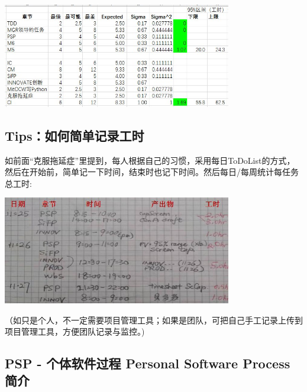 
\includegraphics[width=10cm]{PSPcalculate3wks95rangeScreenshot20221126105325.jpg}

\hypertarget{tipsux5982ux4f55ux7b80ux5355ux8bb0ux5f55ux5de5ux65f6}{%
\subsection{Tips：如何简单记录工时}\label{tipsux5982ux4f55ux7b80ux5355ux8bb0ux5f55ux5de5ux65f6}}

如前面``克服拖延症''里提到，每人根据自己的习惯，采用每日ToDoList的方式，然后在开始前，简单记一下时间，结束时也记下时间。然后每日/每周统计每任务总工时:


\includegraphics[width=10cm]{Psp手工时间表12.jpg}

（如只是个人，不一定需要项目管理工具；如果是团队，可把自己手工记录上传到项目管理工具，方便团队记录与监控。)

\hypertarget{psp---ux4e2aux4f53ux8f6fux4ef6ux8fc7ux7a0b-personal-software-process-ux7b80ux4ecb}{%
\subsection{PSP - 个体软件过程 Personal Software Process
简介}\label{psp---ux4e2aux4f53ux8f6fux4ef6ux8fc7ux7a0b-personal-software-process-ux7b80ux4ecb}}

